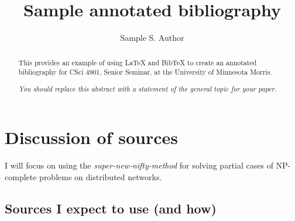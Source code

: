 \documentclass[sigplan,screen,nonacm]{acmart}
\begin{document}
\title{Sample annotated bibliography}

\author{Sample S. Author}

\begin{abstract}
	This provides an example of using LaTeX and BibTeX to create an annotated
	bibliography for CSci 4901, Senior Seminar, at the University of Minnesota
	Morris.
	
	\emph{You should replace this abstract with a statement of the general topic
	for your paper.}
\end{abstract}




\maketitle

\section{Discussion of sources}

I will focus on using the \emph{super-new-nifty-method} for solving partial cases of
NP-complete problems on distributed networks.

\subsection{Sources I expect to use (and how)}
\end{document}
